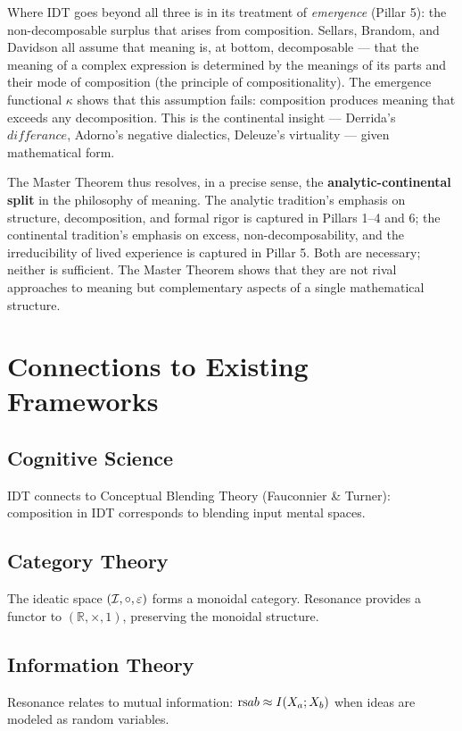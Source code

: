 \begin{interpretation}
Where IDT goes beyond all three is in its treatment of \emph{emergence}
(Pillar 5): the non-decomposable surplus that arises from composition.
Sellars, Brandom, and Davidson all assume that meaning is, at bottom,
decomposable --- that the meaning of a complex expression is determined
by the meanings of its parts and their mode of composition (the principle
of compositionality).  The emergence functional $\kappa$ shows that this
assumption fails: composition produces meaning that exceeds any
decomposition.  This is the continental insight --- Derrida's
$diff\acute{e}rance$, Adorno's negative dialectics, Deleuze's virtuality
--- given mathematical form.

The Master Theorem thus resolves, in a precise sense, the
\textbf{analytic-continental split} in the philosophy of meaning.  The
analytic tradition's emphasis on structure, decomposition, and formal
rigor is captured in Pillars 1--4 and 6; the continental tradition's
emphasis on excess, non-decomposability, and the irreducibility of lived
experience is captured in Pillar 5.  Both are necessary; neither is
sufficient.  The Master Theorem shows that they are not rival approaches
to meaning but complementary aspects of a single mathematical structure.
\end{interpretation}

\section{Connections to Existing Frameworks}

\subsection{Cognitive Science}
IDT connects to Conceptual Blending Theory (Fauconnier \& Turner):
composition in IDT corresponds to blending input mental spaces.

\subsection{Category Theory}
The ideatic space $(\mathcal{I}, \circ, \varepsilon)$ forms a monoidal category.
Resonance provides a functor to $(\mathbb{R}, \times, 1)$, preserving
the monoidal structure.

\subsection{Information Theory}
Resonance relates to mutual information:
$\mathrm{rs}{a}{b} \approx I(X_a ; X_b)$ when ideas are modeled as random variables.


